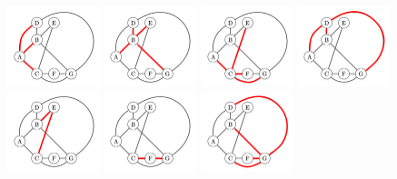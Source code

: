 \documentclass[12pt]{article}
\begin{document}
\begin{enumerate}[a.]
    \begin{figure}[h]
        \includegraphics[width=0.24\textwidth]{images/worksheet_19_q2b1_solution.png}\hfill
        \includegraphics[width=0.24\textwidth]{images/worksheet_19_q2b2_solution.png}\hfill
        \includegraphics[width=0.24\textwidth]{images/worksheet_19_q2b3_solution.png}\hfill
        \includegraphics[width=0.24\textwidth]{images/worksheet_19_q2b4_solution.png}\hfill
        \\
        \includegraphics[width=0.24\textwidth]{images/worksheet_19_q2b5_solution.png}\hfill
        \includegraphics[width=0.24\textwidth]{images/worksheet_19_q2b6_solution.png}\hfill
        \includegraphics[width=0.24\textwidth]{images/worksheet_19_q2b7_solution.png}\hfill

\end{figure}
\end{enumerate}
\end{document}
